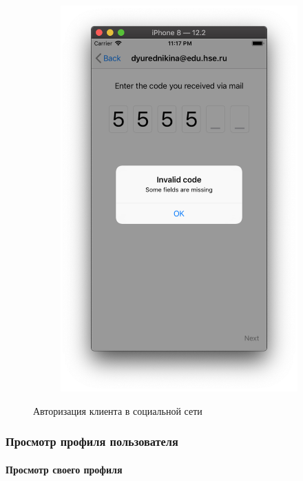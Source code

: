\documentclass[a4paper,12pt]{article}
\begin{document}
\begin{figure}[h!]
\begin{subfigure}[b]{0.3\linewidth}
			\includegraphics[width=\linewidth]{../includes/pmi/invalidcode.png}
		\end{subfigure}
		\caption{\label{pic: auto} Авторизация клиента в социальной сети}
	\end{figure}
	\clearpage
	\subsubsection{Просмотр профиля пользователя}
	\paragraph{Просмотр своего профиля\\}
	
\end{document}
